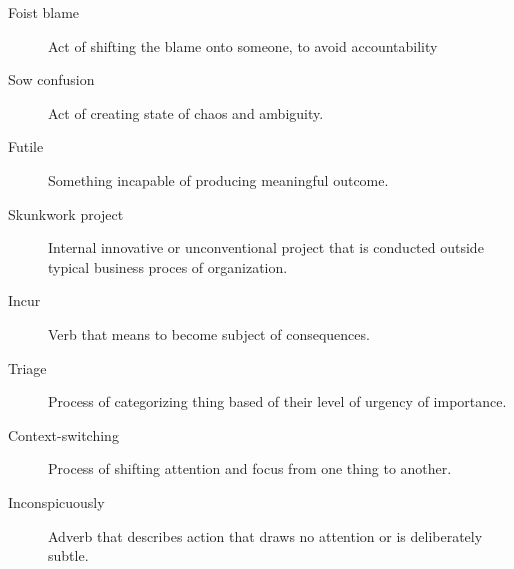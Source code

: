 \documentclass[13pt,twoside,a4paper]{article}
\begin{document}
\begin{description}
    \item[Foist blame] Act of shifting the blame onto someone, to avoid accountability   
    \item[Sow confusion] Act of creating state of chaos and ambiguity.
    \item[Futile] Something incapable of producing meaningful outcome.
    \item[Skunkwork project] Internal innovative or unconventional project that is conducted
                                outside typical business proces of organization.  
    \item[Incur ] Verb that means to become subject of consequences. 
    \item[Triage] Process of categorizing thing based of their level of urgency of importance.
    \item[Context-switching] Process of shifting attention and focus from one thing to another. 
    \item[Inconspicuously] Adverb that describes action that draws no attention or is deliberately subtle.

\end{description}
\end{document}
